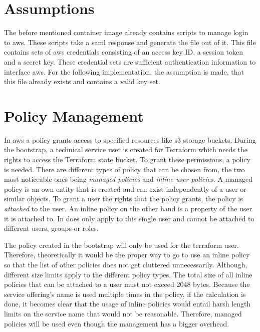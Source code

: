 \section{Assumptions}
The before mentioned container image already contains scripts to manage login to \ac{aws}.
These scripts take a \ac{saml} response and generate the file  out of it.
This file contains sets of \ac{aws} credentials consisting of an access key ID, a session token and a secret key.
These credential sets are sufficient authentication information to interface \ac{aws}.
For the following implementation, the assumption is made, that this file already exists and contains a valid key set.

\section{Policy Management}
In \ac{aws} a policy grants access to specified resources like \ac{s3} storage buckets.
During the bootstrap, a technical service user is created for Terraform which needs the rights to access the Terraform state bucket.
To grant these permissions, a policy is needed.
There are different types of policy that can be chosen from, the two most noticeable ones being \emph{managed policies} and \emph{inline user policies}.
A managed policy is an own entity that is created and can exist independently of a user or similar objects.
To grant a user the rights that the policy grants, the policy is \emph{attached} to the user.
An inline policy on the other hand is a property of the user it is attached to.
In does only apply to this single user and cannot be attached to different users, groups or roles.

The policy created in the bootstrap will only be used for the terraform user.
Therefore, theoretically it would be the proper way to go to use an inline policy so that the list of other policies does not get cluttered unnecessarily.
Although, different size limits apply to the different policy types.
The total size of all inline policies that can be attached to a user must not exceed 2048 bytes.
Because the service offering's name is used multiple times in the policy, if the calculation is done, it becomes clear that the usage of inline policies would entail harsh length limits on the service name that would not be reasonable.
Therefore, managed policies will be used even though the management has a bigger overhead.